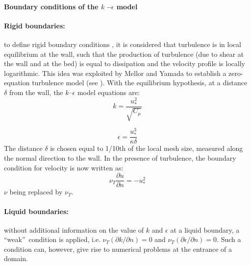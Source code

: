 \paragraph{\label{k-epsilon limites}Boundary conditions of the $k$%
  --$\epsilon$ model}

\paragraph{Rigid boundaries:}

to define rigid boundary conditions%
,
it is considered that turbulence is in local equilibrium at the wall, such
that the production of turbulence (due to shear at the wall and at the bed)
is equal to dissipation and the velocity profile is locally logarithmic. This
idea was exploited by Mellor and Yamada to establish a zero-equation
turbulence model (see \cite{mellor74}).
With the equilibrium hypothesis, at a distance $\delta$ from the wall, the
$k$--$\epsilon$ model equations are:
\begin{equation}
  k=\dfrac{u_\ast^{2}}{\sqrt{C_{\mu}}}
\end{equation}

\begin{equation}
  \epsilon=\dfrac{u_\ast^{3}}{\kappa \delta}%
\end{equation}
The distance $\delta$ is chosen equal to 1/10th of the local mesh size,
measured along the normal direction to the wall. In the presence of
turbulence, the boundary condition for velocity is now written as:
\begin{equation}
\nu_T\dfrac{\partial u}{\partial n}=-u_\ast^{2}%
\end{equation}
$\nu$ being replaced by $\nu_T$.

\paragraph{Liquid boundaries:}

without additional information on the value of $k$ and $\epsilon$ at a
liquid boundary, a \textquotedblleft weak\textquotedblright\ condition is
applied, i.e. $\nu_T(\partial k/\partial n)=0$ and
$\nu_T(\partial\epsilon/\partial n)=0$. Such a condition can, however, give
rise to numerical problems at the entrance of a domain.

